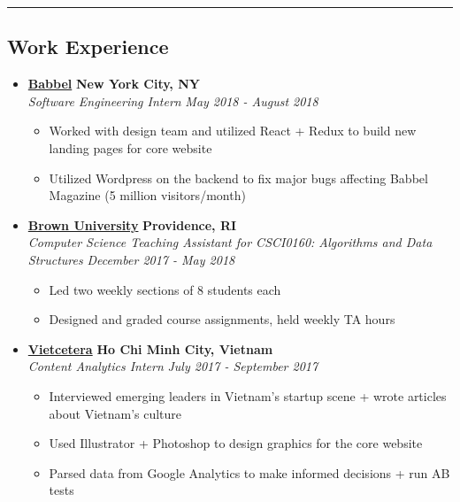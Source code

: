 \documentclass[10pt,letterpaper]{article}
\begin{document}
\hrule
\vspace{-1.0em}
\subsection*{Work Experience}
  \begin{itemize}
    \parskip=-0.5em

    \item[]
    {\href{https://www.babbel.com/}{\textbf{Babbel}} \hfill
      \textbf{New York City, NY}}
    \\
    {\emph{Software Engineering Intern} \hfill \emph{May 2018 - August 2018}}

    \begin{itemize}[label=\textbullet]
      \itemsep0em
      \item Worked with design team and utilized React + Redux to build new landing pages for core website
      \item Utilized Wordpress on the backend to fix major bugs affecting Babbel Magazine (5 million visitors/month)
    \end{itemize}


    \item[]
    {\href{https://www.brown.edu/}{\textbf{Brown University}} \hfill
      \textbf{Providence, RI}}
    \\
    {\emph{Computer Science Teaching Assistant for CSCI0160: Algorithms and Data Structures} \hfill \emph{December 2017 - May 2018}}

    \begin{itemize}[label=\textbullet]
      \itemsep0em
      \item Led two weekly sections of 8 students each
      \item Designed and graded course assignments, held weekly TA hours
    \end{itemize}

    \item[]
    {\href{http://vietcetera.com/}{\textbf{Vietcetera}} \hfill
      \textbf{Ho Chi Minh City, Vietnam}}
    \\
    {\emph{Content Analytics Intern} \hfill \emph{July 2017 - September 2017}}

    \begin{itemize}[label=\textbullet]
      \itemsep0em
      \item Interviewed emerging leaders in Vietnam's startup scene + wrote articles about Vietnam's culture 
      \item Used Illustrator + Photoshop to design graphics for the core website
      \item Parsed data from Google Analytics to make informed decisions + run AB tests
    \end{itemize}


\end{itemize}
\end{document}

